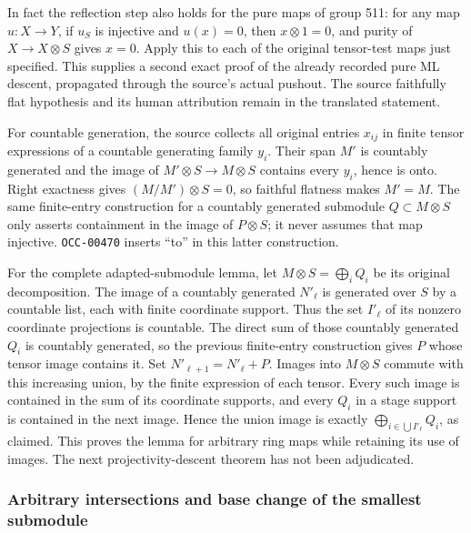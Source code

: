 In fact the reflection step also holds for the pure maps of group 511: for any map \(u:X\to Y\), if \(u_S\) is injective and \(u(x)=0\), then \(x\otimes1=0\), and purity of \(X\to X\otimes S\) gives \(x=0\). Apply this to each of the original tensor-test maps just specified. This supplies a second exact proof of the already recorded pure ML descent, propagated through the source's actual pushout. The source faithfully flat hypothesis and its human attribution remain in the translated statement.

For countable generation, the source collects all original entries \(x_{ij}\) in finite tensor expressions of a countable generating family \(y_i\). Their span \(M'\) is countably generated and the image of \(M'\otimes S\to M\otimes S\) contains every \(y_i\), hence is onto. Right exactness gives \((M/M')\otimes S=0\), so faithful flatness makes \(M'=M\). The same finite-entry construction for a countably generated submodule \(Q\subset M\otimes S\) only asserts containment in the image of \(P\otimes S\); it never assumes that map injective. \texttt{OCC-00470} inserts ``to'' in this latter construction.

For the complete adapted-submodule lemma, let \(M\otimes S=\bigoplus_i Q_i\) be its original decomposition. The image of a countably generated \(N'_\ell\) is generated over \(S\) by a countable list, each with finite coordinate support. Thus the set \(I'_\ell\) of its nonzero coordinate projections is countable. The direct sum of those countably generated \(Q_i\) is countably generated, so the previous finite-entry construction gives \(P\) whose tensor image contains it. Set \(N'_{\ell+1}=N'_\ell+P\). Images into \(M\otimes S\) commute with this increasing union, by the finite expression of each tensor. Every such image is contained in the sum of its coordinate supports, and every \(Q_i\) in a stage support is contained in the next image. Hence the union image is exactly \(\bigoplus_{i\in\bigcup I'_\ell}Q_i\), as claimed. This proves the lemma for arbitrary ring maps while retaining its use of images. The next projectivity-descent theorem has not been adjudicated.

\subsubsection{Arbitrary intersections and base change of the smallest submodule}\label{algebra-proof-013-arbitrary-intersections-and-base-change-of-the-smallest-submodule}

